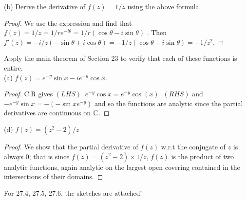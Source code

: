 \documentclass[11pt]{amsart}
\theoremstyle{definition}
\numberwithin{theorem}{section}
\numberwithin{definition}{section}
\numberwithin{equation}{section}
\def\complex{{\mathbb C}\/}
\begin{document}
\noindent (b) Derive the derivative of $f(z) = 1/z$ using the above formula.
\begin{proof}
We use the expression and find that $f(z) = 1/z = 1/re^{-i\theta} = 1/r(\cos \theta - i \sin \theta)$ .
Then $f'(z) = -i/z(-\sin \theta + i\cos \theta)= -1/z(\cos \theta - i\sin \theta) = -1/z^2.$
\end{proof}

\medskip {} Apply the main theorem of Section 23 to verify that each of these functions is entire. \\
\noindent (a) $f(z) = e^{-y}\sin x - ie^{-y} \cos x$.
\begin{proof}
  C.R gives $(LHS)\;\;e^{-y}\cos x = e^{-y} \cos(x)\;\; (RHS)$ and $-e^{-y}\sin x = -(-\sin x e^{-y})$ and so the functions are analytic since the partial derivatives are continuous on $\complex$.
\end{proof}
\noindent (d) $f(z) = (z^2 -2)/z $ 
\begin{proof}
  We show that the partial derivative of $f(z)$ w.r.t the conjugate of $z$ is always $0$; that is since $f(z)= (z^2 -2)\times 1/z$, $f(z)$ is the product of two analytic functions, again analytic on the largest open covering contained in the intersections of their domains.
\end{proof}

For  27.4, 27.5, 27.6, the sketches are attached!
\end{document}
